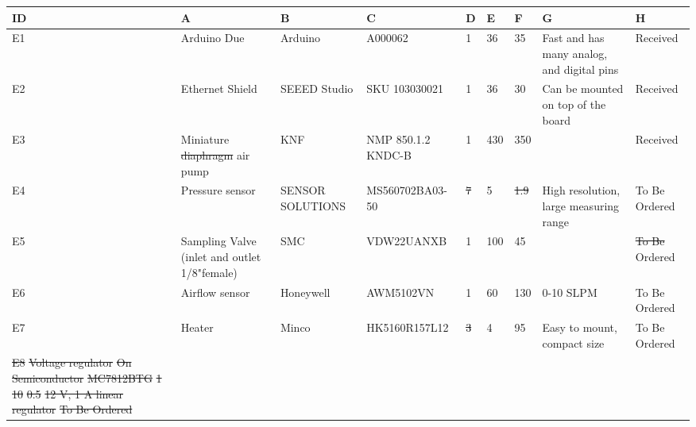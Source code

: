 \documentclass[a4paper,12pt,twoside]{article}
\providecommand{\DIFaddtex}[1]{{\protect\color{blue}\uwave{#1}}} %
\providecommand{\DIFdeltex}[1]{{\protect\color{red}\sout{#1}}}                      %
\providecommand{\DIFaddbegin}{} %
\providecommand{\DIFaddend}{} %
\providecommand{\DIFdelbegin}{} %
\providecommand{\DIFdelend}{} %
\providecommand{\DIFadd}[1]{\texorpdfstring{\DIFaddtex{#1}}{#1}} %
\providecommand{\DIFdel}[1]{\texorpdfstring{\DIFdeltex{#1}}{}} %
\newcommand{\DIFscaledelfig}{0.5}
\newlength{\DIFdelgraphicswidth} %
\newlength{\DIFdelgraphicsheight} %
\newcommand{\DIFaddincludegraphics}[2][]{{\color{blue}\fbox{\DIFOincludegraphics[#1]{#2}}}} %
\newcommand{\DIFdelincludegraphics}[2][]{%
\sbox{\DIFdelgraphicsbox}{\DIFOincludegraphics[#1]{#2}}%
\settoboxwidth{\DIFdelgraphicswidth}{\DIFdelgraphicsbox} %
\settoboxtotalheight{\DIFdelgraphicsheight}{\DIFdelgraphicsbox} %
\scalebox{\DIFscaledelfig}{%
\parbox[b]{\DIFdelgraphicswidth}{\usebox{\DIFdelgraphicsbox}\\[-\baselineskip] \rule{\DIFdelgraphicswidth}{0em}}\llap{\resizebox{\DIFdelgraphicswidth}{\DIFdelgraphicsheight}{%
\setlength{\unitlength}{\DIFdelgraphicswidth}%
\begin{picture}(1,1)%
\thicklines\linethickness{2pt} %
{\color[rgb]{1,0,0}\put(0,0){\framebox(1,1){}}}%
{\color[rgb]{1,0,0}\put(0,0){\line( 1,1){1}}}%
{\color[rgb]{1,0,0}\put(0,1){\line(1,-1){1}}}%
\end{picture}%
}\hspace*{3pt}}} %
} %
\DeclareRobustCommand{\DIFaddbegin}{\DIFOaddbegin \let\includegraphics\DIFaddincludegraphics} %
\DeclareRobustCommand{\DIFaddend}{\DIFOaddend \let\includegraphics\DIFOincludegraphics} %
\DeclareRobustCommand{\DIFdelbegin}{\DIFOdelbegin \let\includegraphics\DIFdelincludegraphics} %
\DeclareRobustCommand{\DIFdelend}{\DIFOaddend \let\includegraphics\DIFOincludegraphics} %
\begin{document}
\begin{landscape}
\begin{longtable} {|m{}|m{}|m{}|m{}|m{}|m{}|m{}|m{}|m{}|} \hline \textbf{ID} & \textbf{A} & \textbf{B} & \textbf{C} & \textbf{D} & \textbf{E} & \textbf{F}  & \textbf{G}  & \textbf{H} \\ \hline E1 & Arduino Due & Arduino & A000062 & 1 & 36 & 35 & Fast and has many analog, and digital pins & Received \\ \hline E2 & Ethernet Shield & SEEED Studio & SKU 103030021 & 1 & 36 & 30 & Can be mounted on  top  of the board & Received \\ \hline E3 & Miniature \DIFdelbegin \DIFdel{diaphragm }\DIFdelend \DIFaddbegin \DIFadd{diagphram }\DIFaddend air pump & KNF & NMP 850.1.2 KNDC-B & 1 & 430 & 350 &  & Received \\ \hline E4 & Pressure sensor & SENSOR SOLUTIONS & MS560702BA03-50 & \DIFdelbegin \DIFdel{7 }\DIFdelend \DIFaddbegin \DIFadd{4 }\DIFaddend & 5 & \DIFdelbegin \DIFdel{1.9 }\DIFdelend \DIFaddbegin \DIFadd{2.3 }\DIFaddend & High  resolution,  large  measuring range & To Be Ordered \\ \hline E5 & Sampling Valve (inlet and outlet 1/8"\DIFaddbegin \DIFadd{" }\DIFaddend female) & SMC & VDW22UANXB & 1 & 100 & 45 &  & \DIFdelbegin \DIFdel{To Be }\DIFdelend Ordered \\ \hline E6 & Airflow sensor & Honeywell & AWM5102VN & 1 & 60 & 130 & 0-10 SLPM & To Be Ordered \\ \hline E7 & Heater & Minco & HK5160R157L12 & \DIFdelbegin \DIFdel{3 }\DIFdelend \DIFaddbegin \DIFadd{4 }\DIFaddend & 4 & 95 & Easy to mount, compact size & To Be Ordered \\ \hline \DIFdelbegin \DIFdel{E8 }%
\DIFdel{Voltage regulator }%
\DIFdel{On Semiconductor }%
\DIFdel{MC7812BTG }%
\DIFdel{1 }%
\DIFdel{10 }%
\DIFdel{0.5 }%
\DIFdel{12 V, 1 A linear regulator }%
\DIFdel{To Be Ordered }%

\end{longtable}
\end{landscape}
\end{document}
